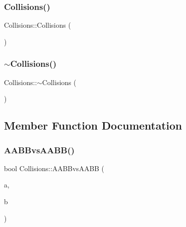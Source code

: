 \subsubsection{\texorpdfstring{Collisions()}{Collisions()}}
{\footnotesize\ttfamily Collisions\+::\+Collisions (\begin{DoxyParamCaption}{ }\end{DoxyParamCaption})}

\mbox{\label{class_collisions_a39a613fd2a130b096c616f74f776d2f9}} 
\subsubsection{\texorpdfstring{$\sim$Collisions()}{~Collisions()}}
{\footnotesize\ttfamily Collisions\+::$\sim$\+Collisions (\begin{DoxyParamCaption}{ }\end{DoxyParamCaption})}



\subsection{Member Function Documentation}
\mbox{\label{class_collisions_a5378f9cb303a13969bb64901027e1ca1}} 
\subsubsection{\texorpdfstring{AABBvsAABB()}{AABBvsAABB()}}
{\footnotesize\ttfamily bool Collisions\+::\+A\+A\+B\+Bvs\+A\+A\+BB (\begin{DoxyParamCaption}\item[{\mbox{\hyperlink{class_collision_box}{Collision\+Box}}}]{a,  }\item[{\mbox{\hyperlink{class_collision_box}{Collision\+Box}}}]{b }\end{DoxyParamCaption})\hspace{0.3cm}{\ttfamily [static]}}

\mbox{\label{class_collisions_adb221a509a95e71fb6002c9f0b59fee8}} 
